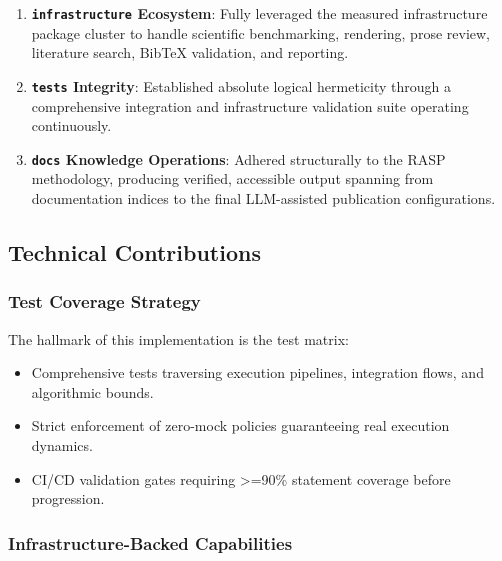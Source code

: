 \documentclass[
  english,
]{article}
\providecommand{\tightlist}{%
  \setlength{\itemsep}{0pt}\setlength{\parskip}{0pt}}
\begin{document}
\begin{enumerate}
\def\labelenumi{\arabic{enumi}.}
\tightlist
\item
  \textbf{\texttt{infrastructure} Ecosystem}: Fully leveraged the
  measured infrastructure package cluster to handle scientific
  benchmarking, rendering, prose review, literature search, BibTeX
  validation, and reporting.
\item
  \textbf{\texttt{tests} Integrity}: Established absolute logical
  hermeticity through a comprehensive integration and infrastructure
  validation suite operating continuously.
\item
  \textbf{\texttt{docs} Knowledge Operations}: Adhered structurally to
  the RASP methodology, producing verified, accessible output spanning
  from documentation indices to the final LLM-assisted publication
  configurations.
\end{enumerate}

\subsection{Technical Contributions}\label{technical-contributions}

\subsubsection{Test Coverage Strategy}\label{test-coverage-strategy}

The hallmark of this implementation is the test matrix:

\begin{itemize}
\tightlist
\item
  Comprehensive tests traversing execution pipelines, integration flows,
  and algorithmic bounds.
\item
  Strict enforcement of zero-mock policies guaranteeing real execution
  dynamics.
\item
  CI/CD validation gates requiring \texorpdfstring{\textgreater{}=}{>=}90\% statement coverage before
  progression.
\end{itemize}

\subsubsection{Infrastructure-Backed
Capabilities}\label{infrastructure-backed-capabilities}
\end{document}
